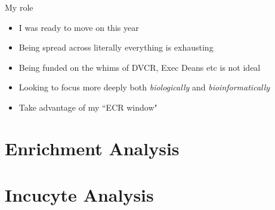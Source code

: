 \documentclass[11pt]{beamer}
\begin{document}
\begin{frame}{My role}

	\begin{itemize}
		\item I was ready to move on this year
		\item Being spread across literally everything is exhausting
		\item Being funded on the whims of DVCR, Exec Deans etc is not ideal
		\item Looking to focus more deeply both \textit{biologically} and \textit{bioinformatically}
		\item Take advantage of my ``ECR window"
	\end{itemize}

\end{frame}


\section{Enrichment Analysis}

\section{Incucyte Analysis}
\end{document}
